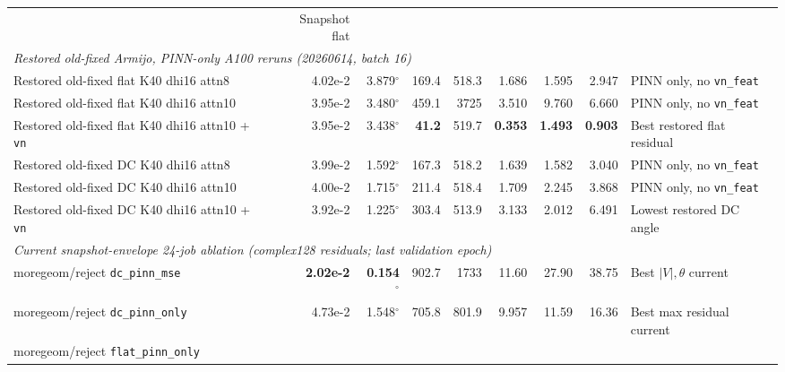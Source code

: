 \documentclass{article}
\begin{document}
\begin{table}[h]
\begin{tabular}{p{3.0cm}rrrrrrrp{2.0cm}}
  & Snapshot flat \\[3pt]
\multicolumn{9}{l}{\textit{Restored old-fixed Armijo, PINN-only A100 reruns (20260614, batch 16)}} \\[2pt]
\rowcolor{bestgreen}
Restored old-fixed
  \newline\quad flat K40 dhi16 attn8
  & 4.02e-2 & 3.879\ensuremath{^\circ} & 169.4 & 518.3
  & 1.686 & 1.595 & 2.947
  & PINN only, no \texttt{vn\_feat} \\[3pt]
\rowcolor{neutralblue}
Restored old-fixed
  \newline\quad flat K40 dhi16 attn10
  & 3.95e-2 & 3.480\ensuremath{^\circ} & 459.1 & 3725
  & 3.510 & 9.760 & 6.660
  & PINN only, no \texttt{vn\_feat} \\[3pt]
\rowcolor{bestgreen}
Restored old-fixed
  \newline\quad flat K40 dhi16 attn10 + \texttt{vn}
  & 3.95e-2 & 3.438\ensuremath{^\circ} & \textbf{41.2} & 519.7
  & \textbf{0.353} & \textbf{1.493} & \textbf{0.903}
  & Best restored flat residual \\[3pt]
\rowcolor{bestgreen}
Restored old-fixed
  \newline\quad DC K40 dhi16 attn8
  & 3.99e-2 & 1.592\ensuremath{^\circ} & 167.3 & 518.2
  & 1.639 & 1.582 & 3.040
  & PINN only, no \texttt{vn\_feat} \\[3pt]
\rowcolor{neutralblue}
Restored old-fixed
  \newline\quad DC K40 dhi16 attn10
  & 4.00e-2 & 1.715\ensuremath{^\circ} & 211.4 & 518.4
  & 1.709 & 2.245 & 3.868
  & PINN only, no \texttt{vn\_feat} \\[3pt]
\rowcolor{neutralblue}
Restored old-fixed
  \newline\quad DC K40 dhi16 attn10 + \texttt{vn}
  & 3.92e-2 & 1.225\ensuremath{^\circ} & 303.4 & 513.9
  & 3.133 & 2.012 & 6.491
  & Lowest restored DC angle \\[3pt]
\midrule
\multicolumn{9}{l}{\textit{Current snapshot-envelope 24-job ablation (complex128 residuals; last validation epoch)}} \\[2pt]
\rowcolor{bestgreen}
moregeom/reject \texttt{dc\_pinn\_mse}
  & \textbf{2.02e-2} & \textbf{0.154\ensuremath{^\circ}} & 902.7 & 1733
  & 11.60 & 27.90 & 38.75
  & Best $|V|,\theta$ current \\[3pt]
\rowcolor{neutralblue}
moregeom/reject \texttt{dc\_pinn\_only}
  & 4.73e-2 & 1.548\ensuremath{^\circ} & 705.8 & 801.9
  & 9.957 & 11.59 & 16.36
  & Best max residual current \\[3pt]
moregeom/reject \texttt{flat\_pinn\_only}

\end{tabular}
\end{table}
\end{document}
